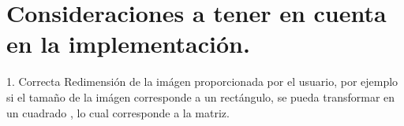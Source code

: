 \documentclass{article}
\begin{document}
\section{Consideraciones a tener en cuenta en la implementación.}
1. Correcta Redimensión de la imágen proporcionada por el usuario, por ejemplo si el tamaño de la imágen corresponde a un rectángulo, se pueda transformar en un cuadrado , lo cual corresponde a la matriz.\\



\end{document}
